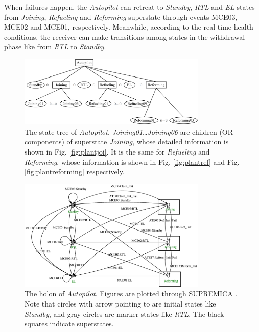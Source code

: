 When failures happen, the \textit{Autopilot} can retreat to \textit{Standby}, \textit{RTL} and \textit{EL} states from \textit{Joining}, \textit{Refueling} and \textit{Reforming} superstate through events MCE03, MCE02 and MCE01, respectively. Meanwhile, according to the real-time health conditions, the receiver can make transitions among states in the withdrawal phase like from \textit{RTL} to \textit{Standby}.

\begin{figure}[h]
	\begin{center}
		\includegraphics[width=0.8\textwidth]{Figures/Figs_Ch14/Fig11_SAutopilot}
		\par\end{center}
	\caption{The state tree of \textit{Autopilot}. \textit{Joining01}\ldots\textit{Joining06} are children (OR components) of superstate \textit{Joining}, whose detailed information is shown in Fig. \ref{fig:plantjoi}. It is the same for \textit{Refueling} and \textit{Reforming}, whose information is shown in Fig. \ref{fig:plantref} and Fig. \ref{fig:plantreforming} respectively.}
	\label{fig:staut} 
\end{figure}

\begin{figure}[h]
	\begin{center}
		\includegraphics[width=0.8\textwidth]{Figures/Figs_Ch14/Fig12_HAutopilot}
		\par\end{center}
	\caption{The holon of \textit{Autopilot}. Figures are plotted through SUPREMICA \cite{akesson2003supremica}. Note that circles with arrow pointing to are initial states like \textit{Standby}, and gray circles are marker states like \textit{RTL}. The black squares indicate superstates.}
	\label{fig:holonaut} 
\end{figure}


